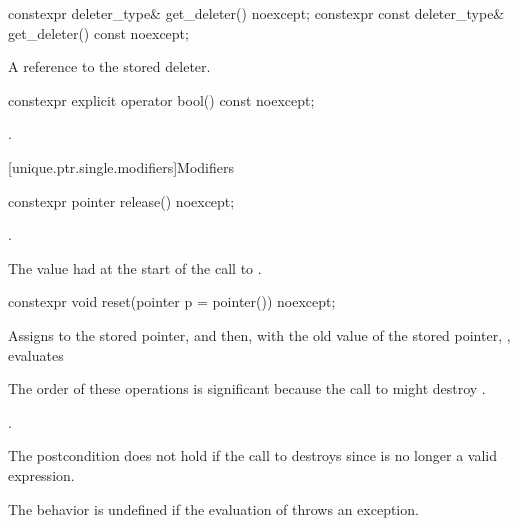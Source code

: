 %
\begin{itemdecl}
constexpr deleter_type& get_deleter() noexcept;
constexpr const deleter_type& get_deleter() const noexcept;
\end{itemdecl}

\begin{itemdescr}
\pnum
\returns
A reference to the stored deleter.
\end{itemdescr}

%
\begin{itemdecl}
constexpr explicit operator bool() const noexcept;
\end{itemdecl}

\begin{itemdescr}
\pnum
\returns
{}.
\end{itemdescr}

[unique.ptr.single.modifiers]{Modifiers}

%
\begin{itemdecl}
constexpr pointer release() noexcept;
\end{itemdecl}

\begin{itemdescr}
\pnum
\ensures
{}.

\pnum
\returns
The value  had at the start of
the call to .
\end{itemdescr}

%
\begin{itemdecl}
constexpr void reset(pointer p = pointer()) noexcept;
\end{itemdecl}

\begin{itemdescr}
\pnum
\effects
Assigns  to the stored pointer, and then,
with the old value of the stored pointer, ,
evaluates 
\begin{note}
The order of these operations is significant
because the call to  might destroy .
\end{note}

\pnum
\ensures
{}.
\begin{note}
The postcondition does not hold if the call to 
destroys  since  is no longer a valid expression.
\end{note}

\pnum
\remarks
The behavior is undefined
if the evaluation of  throws an exception.
\end{itemdescr}

